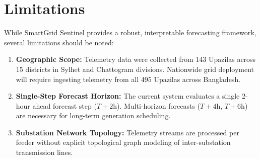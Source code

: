 \section{Limitations}
While SmartGrid Sentinel provides a robust, interpretable forecasting framework, several limitations should be noted:
\begin{enumerate}
    \item \textbf{Geographic Scope:} Telemetry data were collected from 143 Upazilas across 15 districts in Sylhet and Chattogram divisions. Nationwide grid deployment will require ingesting telemetry from all 495 Upazilas across Bangladesh.
    \item \textbf{Single-Step Forecast Horizon:} The current system evaluates a single 2-hour ahead forecast step ($T+2\text{h}$). Multi-horizon forecasts ($T+4\text{h}$, $T+6\text{h}$) are necessary for long-term generation scheduling.
    \item \textbf{Substation Network Topology:} Telemetry streams are processed per feeder without explicit topological graph modeling of inter-substation transmission lines.
\end{enumerate}
